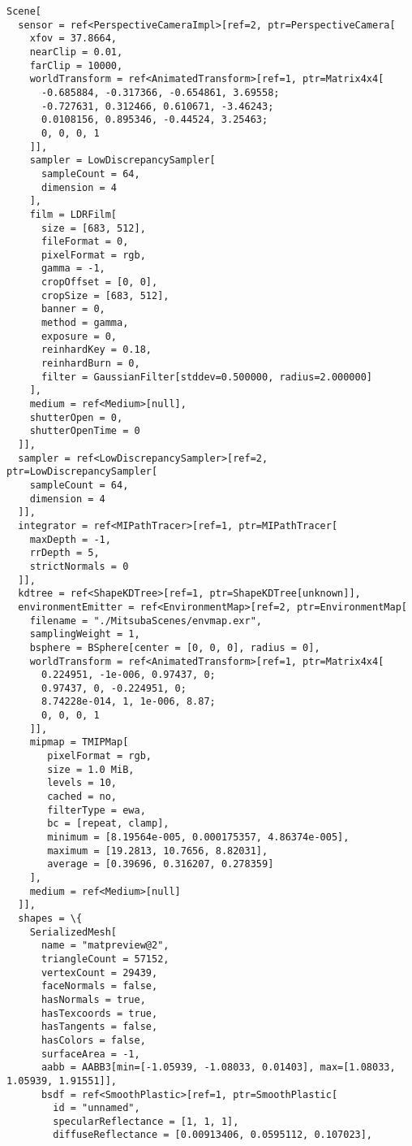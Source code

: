 \documentclass[11pt, a4paper, landscape]{scrartcl}
\begin{document}
    \begin{Verbatim}[commandchars=\\\{\}]
Scene[
  sensor = ref<PerspectiveCameraImpl>[ref=2, ptr=PerspectiveCamera[
    xfov = 37.8664,
    nearClip = 0.01,
    farClip = 10000,
    worldTransform = ref<AnimatedTransform>[ref=1, ptr=Matrix4x4[
      -0.685884, -0.317366, -0.654861, 3.69558;
      -0.727631, 0.312466, 0.610671, -3.46243;
      0.0108156, 0.895346, -0.44524, 3.25463;
      0, 0, 0, 1
    ]],
    sampler = LowDiscrepancySampler[
      sampleCount = 64,
      dimension = 4
    ],
    film = LDRFilm[
      size = [683, 512],
      fileFormat = 0,
      pixelFormat = rgb,
      gamma = -1,
      cropOffset = [0, 0],
      cropSize = [683, 512],
      banner = 0,
      method = gamma,
      exposure = 0,
      reinhardKey = 0.18,
      reinhardBurn = 0,
      filter = GaussianFilter[stddev=0.500000, radius=2.000000]
    ],
    medium = ref<Medium>[null],
    shutterOpen = 0,
    shutterOpenTime = 0
  ]],
  sampler = ref<LowDiscrepancySampler>[ref=2, ptr=LowDiscrepancySampler[
    sampleCount = 64,
    dimension = 4
  ]],
  integrator = ref<MIPathTracer>[ref=1, ptr=MIPathTracer[
    maxDepth = -1,
    rrDepth = 5,
    strictNormals = 0
  ]],
  kdtree = ref<ShapeKDTree>[ref=1, ptr=ShapeKDTree[unknown]],
  environmentEmitter = ref<EnvironmentMap>[ref=2, ptr=EnvironmentMap[
    filename = "./MitsubaScenes/envmap.exr",
    samplingWeight = 1,
    bsphere = BSphere[center = [0, 0, 0], radius = 0],
    worldTransform = ref<AnimatedTransform>[ref=1, ptr=Matrix4x4[
      0.224951, -1e-006, 0.97437, 0;
      0.97437, 0, -0.224951, 0;
      8.74228e-014, 1, 1e-006, 8.87;
      0, 0, 0, 1
    ]],
    mipmap = TMIPMap[
       pixelFormat = rgb,
       size = 1.0 MiB,
       levels = 10,
       cached = no,
       filterType = ewa,
       bc = [repeat, clamp],
       minimum = [8.19564e-005, 0.000175357, 4.86374e-005],
       maximum = [19.2813, 10.7656, 8.82031],
       average = [0.39696, 0.316207, 0.278359]
    ],
    medium = ref<Medium>[null]
  ]],
  shapes = \{
    SerializedMesh[
      name = "matpreview@2",
      triangleCount = 57152,
      vertexCount = 29439,
      faceNormals = false,
      hasNormals = true,
      hasTexcoords = true,
      hasTangents = false,
      hasColors = false,
      surfaceArea = -1,
      aabb = AABB3[min=[-1.05939, -1.08033, 0.01403], max=[1.08033, 1.05939, 1.91551]],
      bsdf = ref<SmoothPlastic>[ref=1, ptr=SmoothPlastic[
        id = "unnamed",
        specularReflectance = [1, 1, 1],
        diffuseReflectance = [0.00913406, 0.0595112, 0.107023],

\end{Verbatim}
\end{document}
